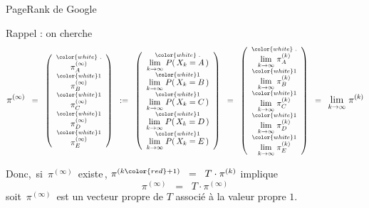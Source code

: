 \begin{frame}{\Large PageRank de Google}

Rappel : on cherche
{\tiny\begin{equation*}
	\textnormal{\large$\pi^{(\infty)}$}
	\;\; = \;\;
		\left(\begin{array}{c}
			\overset{{\color{white}\textnormal{ .}}}{\pi_{A}^{(\infty)}} \\
			\overset{{\color{white}\textnormal{1}}}{\pi_{B}^{(\infty)}} \\
			\overset{{\color{white}\textnormal{1}}}{\pi_{C}^{(\infty)}} \\
			\overset{{\color{white}\textnormal{1}}}{\pi_{D}^{(\infty)}} \\
			\overset{{\color{white}\textnormal{1}}}{\pi_{E}^{(\infty)}}
		\end{array}\right)
	\;\; := \;\;
		\left(\begin{array}{c}
			\overset{{\color{white}\textnormal{ .}}}{\underset{k\rightarrow\infty}{\lim}\; P(\,X_{k} = A\,)} \\
			\overset{{\color{white}\textnormal{1}}}{\underset{k\rightarrow\infty}{\lim}\; P(\,X_{k} = B\,)} \\
			\overset{{\color{white}\textnormal{1}}}{\underset{k\rightarrow\infty}{\lim}\; P(\,X_{k} = C\,)} \\
			\overset{{\color{white}\textnormal{1}}}{\underset{k\rightarrow\infty}{\lim}\; P(\,X_{k} = D\,)} \\
			\overset{{\color{white}\textnormal{1}}}{\underset{k\rightarrow\infty}{\lim}\; P(\,X_{k} = E\,)}
		\end{array}\right)
	\;\; = \;\;
		\left(\begin{array}{c}
			\overset{{\color{white}\textnormal{ .}}}{\underset{k\rightarrow\infty}{\lim}\; \pi_{A}^{(k)} }\\
			\overset{{\color{white}\textnormal{1}}}{\underset{k\rightarrow\infty}{\lim}\; \pi_{B}^{(k)} }\\
			\overset{{\color{white}\textnormal{1}}}{\underset{k\rightarrow\infty}{\lim}\; \pi_{C}^{(k)} }\\
			\overset{{\color{white}\textnormal{1}}}{\underset{k\rightarrow\infty}{\lim}\; \pi_{D}^{(k)} }\\
			\overset{{\color{white}\textnormal{1}}}{\underset{k\rightarrow\infty}{\lim}\; \pi_{E}^{(k)} }
		\end{array}\right)
	\;\; = \;\;
		\textnormal{\large$\underset{k\rightarrow\infty}{\lim}\;\pi^{(k)}$}
	\end{equation*}}

\pause
Donc, \,si \,$\pi^{(\infty)}$\, existe\,,\;
\pause\;$\pi^{(k{\color{red}+1})} \;\; = \;\; T \cdot \pi^{(k)}$\; \pause implique
\begin{equation*}
\pi^{(\infty)} \;\; = \;\; T \cdot \pi^{(\infty)}
\end{equation*}
\pause soit \,$\pi^{(\infty)}$\, est un vecteur propre de $T$ \pause associ\'e \`a la valeur propre $1$.

\end{frame}
\normalsize

